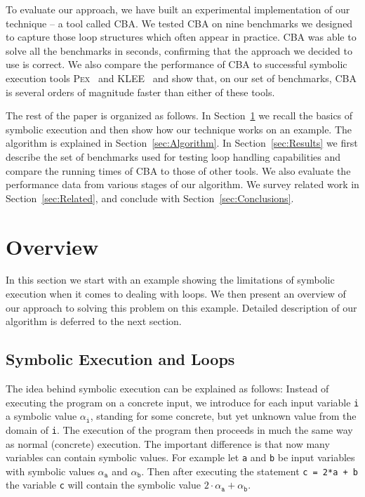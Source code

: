 \documentclass{llncs}
\newcommand{\Pex}{\textsc{Pex}\xspace}
\newcommand{\Klee}{\textsc{KLEE}\xspace}
\newcommand{\CBATool}{\textsc{CBA}\xspace}
\begin{document}
To evaluate our approach, we have built an experimental implementation of
our technique -- a tool called \CBATool.
We tested \CBATool on nine benchmarks we designed to capture those loop
structures which often appear in practice. 
\CBATool was able to solve all the benchmarks in seconds, confirming that the
approach we decided to use is correct. We also compare the performance of
\CBATool to successful symbolic execution tools
\Pex~\cite{TdH08,Pex} and \Klee~\cite{CDE08} and show that, on our set of
benchmarks, \CBATool is several orders of magnitude faster than either of
these tools.

The rest of the paper is organized as follows. In Section~\ref{sec:Overview}
we recall the basics of symbolic execution and then show how our technique
works on an example. The algorithm is explained in 
Section~\ref{sec:Algorithm}. 
In Section~\ref{sec:Results} we first describe the set of benchmarks used for testing
loop handling capabilities and compare the running times of \CBATool to
those of other tools. We also evaluate the performance data from various stages
of our algorithm. We survey related work in Section~\ref{sec:Related}, and
conclude with Section~\ref{sec:Conclusions}.


\section{Overview}
\label{sec:Overview}
In this section we start with an example showing the limitations of symbolic
execution when it comes to dealing with loops. We then present an overview
of our approach to solving this problem on this example. Detailed
description of our algorithm is deferred to the next section.


\subsection{Symbolic Execution and Loops}
\label{sec:Overview_1}

The idea behind symbolic execution can be explained as follows: Instead of
executing the program on a concrete input, we introduce for each input variable
\texttt{i} a symbolic value $\alpha_\mathtt{i}$, standing for some
concrete, but yet unknown value from the domain of \texttt{i}. The execution
of the program then proceeds in much the same way as normal (concrete) execution. The
important difference is that now many variables can  contain symbolic
values. For example let \texttt{a} and \texttt{b} be input variables with
symbolic values $\alpha_\mathtt{a}$ and $\alpha_\mathtt{b}$. Then  after
executing the statement \texttt{c = 2*a + b} the variable \texttt{c} will
contain the symbolic  value $2\cdot\alpha_\mathtt{a}+\alpha_\mathtt{b}$.
\end{document}
